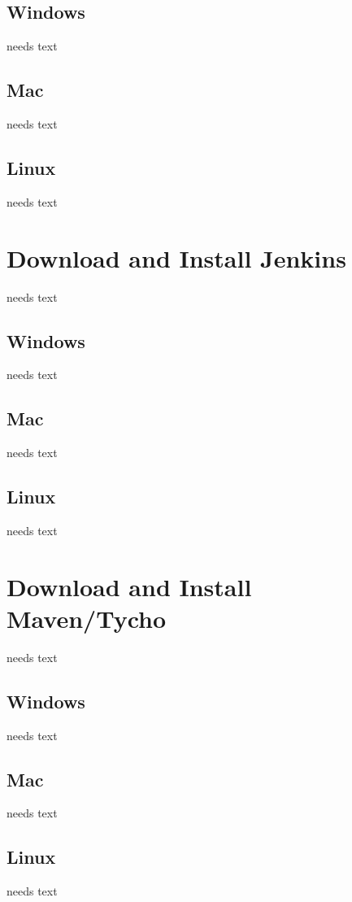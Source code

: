 \documentclass[a4paper,10pt,twoside]{book}
\begin{document}
\subsection{Windows}
needs text

\subsection{Mac}
needs text

\subsection{Linux}
needs text

\section{Download and Install Jenkins}
needs text

\subsection{Windows}
needs text

\subsection{Mac}
needs text

\subsection{Linux}
needs text

\section{Download and Install Maven/Tycho}
needs text

\subsection{Windows}
needs text

\subsection{Mac}
needs text

\subsection{Linux}
needs text
\end{document}
